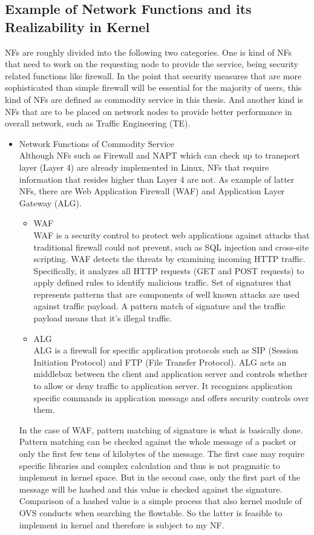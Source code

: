 \subsection{Example of Network Functions and its Realizability in Kernel}
NFs are roughly divided into the following two categories. One is kind of NFs that need to work on the requesting node to provide the service, being security related functions like firewall. In the point that security measures that are more sophisticated than simple firewall will be essential for the majority of users, this kind of NFs are defined as commodity service in this thesis. And another kind is NFs that are to be placed on network nodes to provide better performance in overall network, such as Traffic Engineering (TE). 
\begin{itemize}
	\item Network Functions of Commodity Service\\
		Although NFs such as Firewall and NAPT which can check up to transport layer (Layer 4) are already implemented in Linux, NFs that require information that resides higher than Layer 4 are not. As example of latter NFs, there are Web Application Firewall (WAF) and Application Layer Gateway (ALG). 
		\begin{itemize}
			\item WAF\\
				WAF is a security control to protect web applications against attacks that traditional firewall could not prevent, such as SQL injection and cross-site scripting. WAF detects the threats by examining incoming HTTP traffic. Specifically, it analyzes all HTTP requests (GET and POST requests) to apply defined rules to identify malicious traffic. Set of signatures that represents patterns that are components of well known attacks are used against traffic payload. A pattern match of signature and the traffic payload means that it's illegal traffic.
			\item ALG\\
				ALG is a firewall for specific application protocols such as SIP (Session Initiation Protocol) and FTP (File Transfer Protocol). ALG acts an middlebox between the client and application server and controls whether to allow or deny traffic to application server. It recognizes application specific commands in application message and offers security controls over them. 
		\end{itemize}
	
		In the case of WAF, pattern matching of signature is what is basically done. Pattern matching can be checked against the whole message of a packet or only the first few tens of kilobytes of the message. The first case may require specific libraries and complex calculation and thus is not pragmatic to implement in kernel space. But in the second case, only the first part of the message will be hashed and this value is checked against the signature. Comparison of a hashed value is a simple process that also kernel module of OVS conducts when searching the flowtable. So the latter is feasible to implement in kernel and therefore is subject to my NF. 
		

\end{itemize}
